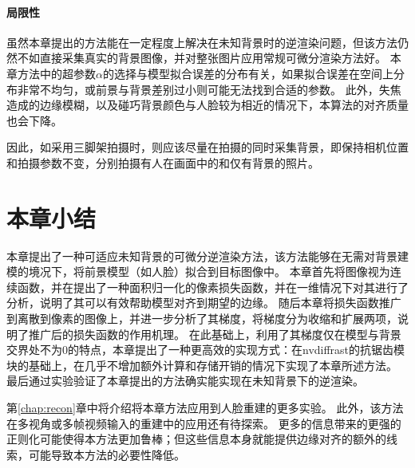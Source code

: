 \paragraph{局限性}

虽然本章提出的方法能在一定程度上解决在未知背景时的逆渲染问题，但该方法仍然不如直接采集真实的背景图像，并对整张图片应用常规可微分渲染方法好。
本章方法中的超参数$\alpha$的选择与模型拟合误差的分布有关，如果拟合误差在空间上分布非常不均匀，或前景与背景差别过小则可能无法找到合适的参数。
此外，失焦造成的边缘模糊，以及碰巧背景颜色与人脸较为相近的情况下，本算法的对齐质量也会下降。

因此，如采用三脚架拍摄时，则应该尽量在拍摄的同时采集背景，即保持相机位置和拍摄参数不变，分别拍摄有人在画面中的和仅有背景的照片。

\section*{本章小结}

本章提出了一种可适应未知背景的可微分逆渲染方法，该方法能够在无需对背景建模的境况下，将前景模型（如人脸）拟合到目标图像中。
本章首先将图像视为连续函数，并在提出了一种面积归一化的像素损失函数，并在一维情况下对其进行了分析，说明了其可以有效帮助模型对齐到期望的边缘。
随后本章将损失函数推广到离散到像素的图像上，并进一步分析了其梯度，将梯度分为收缩和扩展两项，说明了推广后的损失函数的作用机理。
在此基础上，利用了其梯度仅在模型与背景交界处不为0的特点，本章提出了一种更高效的实现方式：在nvdiffrast的抗锯齿模块的基础上，在几乎不增加额外计算和存储开销的情况下实现了本章所述方法。
最后通过实验验证了本章提出的方法确实能实现在未知背景下的逆渲染。

第\ref{chap:recon}章中将介绍将本章方法应用到人脸重建的更多实验。
此外，该方法在多视角或多帧视频输入的重建中的应用还有待探索。
更多的信息带来的更强的正则化可能使得本方法更加鲁棒；但这些信息本身就能提供边缘对齐的额外的线索，可能导致本方法的必要性降低。
